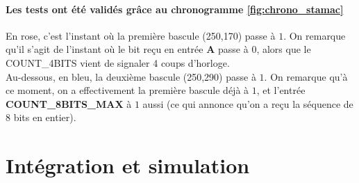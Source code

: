 \documentclass[a4paper]{article} %
\begin{document}
\begin{tcolorbox}[colframe=Monokaimagenta,colback=white]
\begin{figure}[H]
\label{fig:graphe_etat}
\end{figure}


\paragraph{Les tests ont été validés grâce au chronogramme \ref{fig:chrono_stamac}}
En rose, c'est l'instant où la première bascule (250,170) passe à $1$. On remarque qu'il s'agit de l'instant où le bit reçu en entrée \textbf{A} passe à $0$, alors que le COUNT\_4BITS vient de signaler 4 coups d'horloge.\\
Au-dessous, en bleu, la deuxième bascule (250,290) passe à $1$. On remarque qu'à ce moment, on a effectivement la première bascule déjà à $1$, et l'entrée \textbf{COUNT\_8BITS\_MAX} à $1$ aussi (ce qui annonce qu'on a reçu la séquence de 8 bits en entier).
\end{tcolorbox}
\pagebreak

\section {Intégration et simulation}
\end{document}

